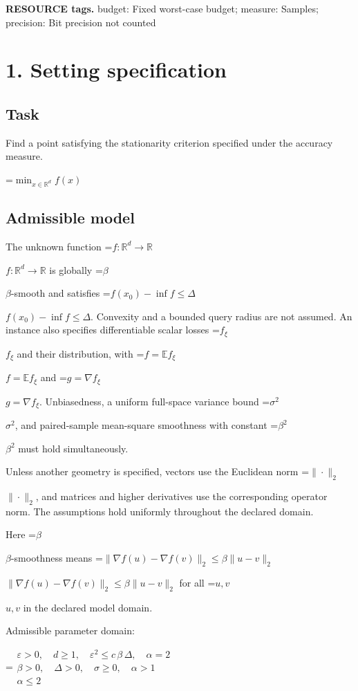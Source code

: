 \documentclass[10pt,a4paper]{article}
\newcommand{\AtlasMath}[1]{\par\begingroup\centering\setbox0=\hbox{$\displaystyle #1$}\ifdim\wd0>1.4\linewidth\typeout{ATLAS WIDE FORMULA: \the\wd0}\fi\ifdim\wd0>\linewidth\resizebox{\linewidth}{!}{\box0}\else\box0\fi\par\endgroup}
\newcommand{\AtlasInlineMath}[1]{\begingroup\setbox0=\hbox{$#1$}\ifdim\wd0>.4\linewidth\endgroup\AtlasMath{#1}\else\endgroup$#1$\fi}
\begin{document}
\textbf{RESOURCE tags.} budget: Fixed worst-case budget; measure: Samples; precision: Bit precision not counted



\section{1. Setting specification}


\subsection{Task}


Find a point satisfying the stationarity criterion specified under the accuracy measure.




\AtlasMath{\min_{x\in \mathbb{R}^d}f(x)}




\subsection{Admissible model}


The unknown function \AtlasInlineMath{f:\mathbb R^d\to\mathbb R} is globally \AtlasInlineMath{\beta}-smooth and satisfies \AtlasInlineMath{f(x_0)-\inf f\le\Delta}. Convexity and a bounded query radius are not assumed. An instance also specifies differentiable scalar losses \AtlasInlineMath{f_\xi} and their distribution, with \AtlasInlineMath{f=\mathbb E f_\xi} and \AtlasInlineMath{g=\nabla f_\xi}. Unbiasedness, a uniform full-space variance bound \AtlasInlineMath{\sigma^2}, and paired-sample mean-square smoothness with constant \AtlasInlineMath{\beta^2} must hold simultaneously.



Unless another geometry is specified, vectors use the Euclidean norm \AtlasInlineMath{\|\cdot\|_2}, and matrices and higher derivatives use the corresponding operator norm. The assumptions hold uniformly throughout the declared domain.



Here \AtlasInlineMath{\beta}-smoothness means \AtlasInlineMath{\|\nabla f(u)-\nabla f(v)\|_2\le\beta\|u-v\|_2} for all \AtlasInlineMath{u,v} in the declared model domain.



Admissible parameter domain:


\AtlasMath{\begin{gathered}\varepsilon > 0,\quad d \ge 1,\quad {\varepsilon}^{2} \le c\,\beta\,\Delta,\quad \alpha = 2\\\beta > 0,\quad \Delta > 0,\quad \sigma \ge 0,\quad \alpha > 1\\\alpha \le 2\end{gathered}}
\end{document}
